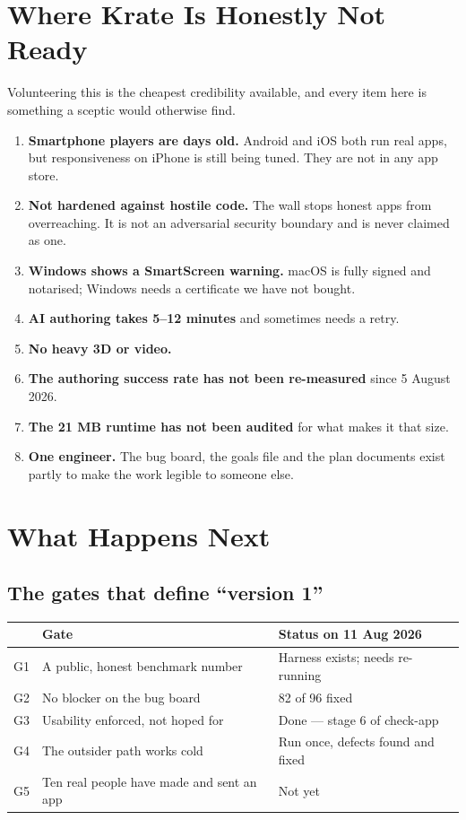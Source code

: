 \documentclass[11pt,a4paper]{report}
\begin{document}
\chapter{Where Krate Is Honestly Not Ready}

Volunteering this is the cheapest credibility available, and every item
here is something a sceptic would otherwise find.

\begin{enumerate}[leftmargin=*]
  \item \textbf{Smartphone players are days old.} Android and iOS both run
    real apps, but responsiveness on iPhone is still being tuned. They are
    not in any app store.
  \item \textbf{Not hardened against hostile code.} The wall stops honest
    apps from overreaching. It is not an adversarial security boundary and
    is never claimed as one.
  \item \textbf{Windows shows a SmartScreen warning.} macOS is fully
    signed and notarised; Windows needs a certificate we have not bought.
  \item \textbf{AI authoring takes 5--12 minutes} and sometimes needs a
    retry.
  \item \textbf{No heavy 3D or video.}
  \item \textbf{The authoring success rate has not been re-measured}
    since 5 August 2026.
  \item \textbf{The 21 MB runtime has not been audited} for what makes it
    that size.
  \item \textbf{One engineer.} The bug board, the goals file and the plan
    documents exist partly to make the work legible to someone else.
\end{enumerate}

\chapter{What Happens Next}

\section{The gates that define ``version 1''}

\begin{center}
\begin{tabular}{clp{6.6cm}}
\toprule
& \textbf{Gate} & \textbf{Status on 11 Aug 2026} \\
\midrule
G1 & A public, honest benchmark number & Harness exists; needs re-running \\
G2 & No blocker on the bug board & 82 of 96 fixed \\
G3 & Usability enforced, not hoped for & Done --- stage 6 of check-app \\
G4 & The outsider path works cold & Run once, defects found and fixed \\
G5 & Ten real people have made and sent an app & Not yet \\
\bottomrule
\end{tabular}
\end{center}
\end{document}
